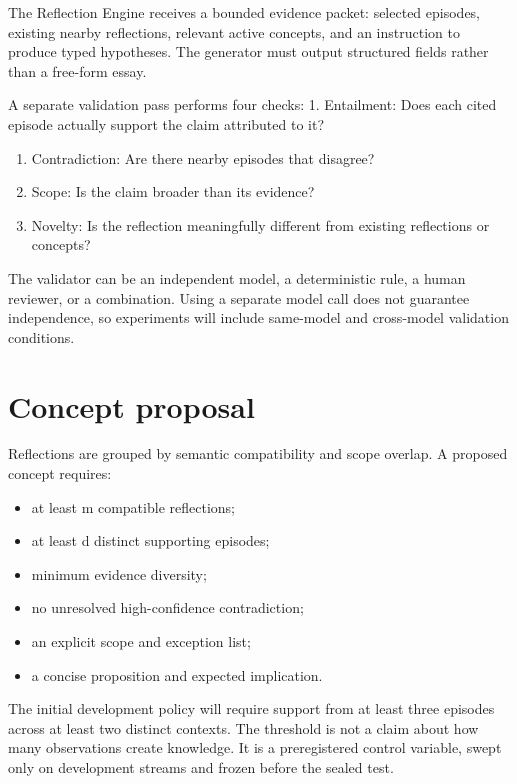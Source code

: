 \documentclass[
  english,
  a4paper,
  DIV=11,
  numbers=noendperiod]{scrreprt}
\providecommand{\tightlist}{%
  \setlength{\itemsep}{0pt}\setlength{\parskip}{0pt}}
\begin{document}
The Reflection Engine receives a bounded evidence packet: selected
episodes, existing nearby reflections, relevant active concepts, and an
instruction to produce typed hypotheses. The generator must output
structured fields rather than a free-form essay.

A separate validation pass performs four checks: 1. Entailment: Does
each cited episode actually support the claim attributed to it?

\begin{enumerate}
\def\labelenumi{\arabic{enumi}.}
\setcounter{enumi}{1}
\item
  Contradiction: Are there nearby episodes that disagree?
\item
  Scope: Is the claim broader than its evidence?
\item
  Novelty: Is the reflection meaningfully different from existing
  reflections or concepts?
\end{enumerate}

The validator can be an independent model, a deterministic rule, a human
reviewer, or a combination. Using a separate model call does not
guarantee independence, so experiments will include same-model and
cross-model validation conditions.

\section{Concept proposal}\label{concept-proposal}

Reflections are grouped by semantic compatibility and scope overlap. A
proposed concept requires:

\begin{itemize}
\tightlist
\item
  at least m compatible reflections;
\item
  at least d distinct supporting episodes;
\item
  minimum evidence diversity;
\item
  no unresolved high-confidence contradiction;
\item
  an explicit scope and exception list;
\item
  a concise proposition and expected implication.
\end{itemize}

The initial development policy will require support from at least three
episodes across at least two distinct contexts. The threshold is not a
claim about how many observations create knowledge. It is a
preregistered control variable, swept only on development streams and
frozen before the sealed test.
\end{document}
